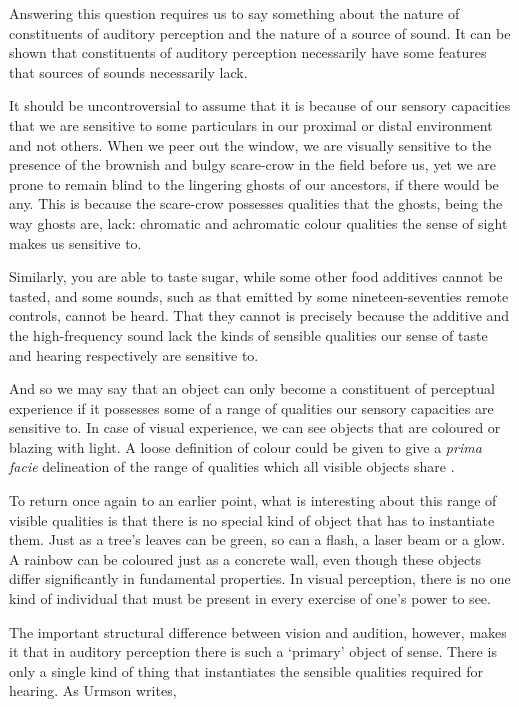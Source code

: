 \documentclass[sloppy, journal, git, bytitle, dodraft]{humapap}
\begin{document}
Answering this question requires us to say something about the nature of constituents of auditory perception and the nature of a source of sound.  It can be shown that constituents of auditory perception necessarily have some features that sources of sounds necessarily lack. 

It should be uncontroversial to assume that it is because of our sensory capacities that we are sensitive to some particulars in our proximal or distal environment and not others. When we peer out the window, we are visually sensitive to the presence of the brownish and bulgy scare-crow in the field before us, yet we are prone to remain blind to the lingering ghosts of our ancestors, if there would be any. This is because the scare-crow possesses qualities that the ghosts, being the way ghosts are, lack: chromatic and achromatic colour qualities the sense of sight makes us sensitive to. 

Similarly, you are able to taste sugar, while some other food additives cannot be tasted, and some sounds, such as that emitted by some nineteen-seventies remote controls, cannot be heard. That they cannot is precisely because the additive and the high-frequency sound lack the kinds of sensible qualities our sense of taste and hearing respectively are sensitive to. 

And so we may say that an object can only become a constituent of perceptual experience if it possesses some of a range of qualities our sensory capacities are sensitive to. In case of visual experience,  we can see objects that are coloured or blazing with light. A loose definition of colour could be given to give a \emph{prima facie} delineation of the range of qualities which all visible objects share \autocite[p. 334]{martin2012aa}. 

To return once again to an earlier point, what is interesting about this range of visible qualities is that there is no special kind of object that has to instantiate them. Just as a tree's leaves can be green, so can a flash, a laser beam or a glow. A rainbow can be coloured just as a concrete wall, even though these objects differ significantly in fundamental properties. In visual perception, there is no one kind of individual that must be present in every exercise of one's power to see. 

The important structural difference between vision and audition, however, makes it that in auditory perception there is such a `primary' object of sense. There is only a single kind of thing that instantiates the sensible qualities required for hearing. As Urmson writes, 
\end{document}
